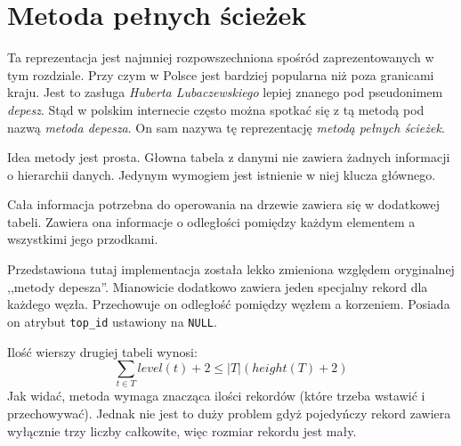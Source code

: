 \section{Metoda pełnych ścieżek}
% 




Ta reprezentacja jest najmniej rozpowszechniona spośród zaprezentowanych w tym rozdziale.
Przy czym w Polsce jest bardziej popularna niż poza granicami kraju.
Jest to zasługa \emph{Huberta Lubaczewskiego} lepiej znanego pod pseudonimem \emph{depesz}.
Stąd w polskim internecie często można spotkać się z tą metodą pod nazwą \emph{metoda depesza}.
On sam nazywa tę reprezentację \emph{metodą pełnych ścieżek}.




Idea metody jest prosta. 
Głowna tabela z danymi nie zawiera żadnych informacji o hierarchii danych. 
Jedynym wymogiem jest istnienie w niej klucza głównego.

Cała informacja potrzebna do operowania na drzewie zawiera się w dodatkowej tabeli. 
Zawiera ona informacje o odległości pomiędzy każdym elementem a wszystkimi jego przodkami.


Przedstawiona tutaj implementacja została lekko zmieniona względem oryginalnej ,,metody depesza''.
Mianowicie dodatkowo zawiera jeden specjalny rekord dla każdego węzła.
Przechowuje on odległość pomiędzy węzłem a korzeniem.
Posiada on atrybut \verb|top_id| ustawiony na \verb|NULL|.


Ilość wierszy drugiej tabeli wynosi:
\begin{displaymath}
    \sum_{t \in T} level(t) + 2 \leq |T|(height(T) + 2)
\end{displaymath}
Jak widać, metoda wymaga znacząca ilości rekordów (które trzeba wstawić i przechowywać).
Jednak nie jest to duży problem gdyż pojedyńczy rekord zawiera wyłącznie trzy liczby całkowite, więc rozmiar rekordu jest mały.

